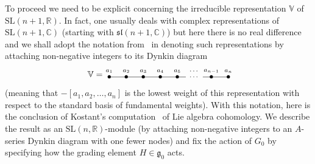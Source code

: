 \documentclass[pdftex]{sigma}
\begin{document}
To proceed we need to be explicit concerning the irreducible representation
${\mathbb{V}}$ of ${\mathrm{SL}}(n+1,{\mathbb{R}})$. In fact, one usually deals
with complex representations of ${\mathrm{SL}}(n+1,{\mathbb{C}})$ (starting
with ${\mathfrak{sl}}(n+1,{\mathbb{C}})$) but here there is no real dif\/ference
and we shall adopt the notation from~\cite{beastwood} in denoting such
representations by attaching non-negative integers to its Dynkin diagram
\[{\mathbb{V}}=\enskip\raisebox{-5pt}{\begin{picture}(140,17)
\put(0,5){\makebox(0,0){$\bullet$}}
\put(20,5){\makebox(0,0){$\bullet$}}
\put(40,5){\makebox(0,0){$\bullet$}}
\put(60,5){\makebox(0,0){$\bullet$}}
\put(80,5){\makebox(0,0){$\bullet$}}
\put(120,5){\makebox(0,0){$\bullet$}}
\put(140,5){\makebox(0,0){$\bullet$}}
\put(0,5){\line(1,0){90}}
\put(100,5){\makebox(0,0){\scriptsize$\cdots$}}
\put(110,5){\line(1,0){30}}
\put(0,12){\makebox(0,0){\scriptsize$a_1$}}
\put(20,12){\makebox(0,0){\scriptsize$a_2$}}
\put(40,12){\makebox(0,0){\scriptsize$a_3$}}
\put(60,12){\makebox(0,0){\scriptsize$a_4$}}
\put(80,12){\makebox(0,0){\scriptsize$a_5$}}
\put(100,12){\makebox(0,0){\scriptsize$\cdots$}}
\put(120,12){\makebox(0,0){\scriptsize$a_{n-1}$}}
\put(140,12){\makebox(0,0){\scriptsize$a_n$}}
\end{picture}}\]
(meaning that $-[a_1,a_2,\dots,a_n]$ is the lowest weight of this
representation with respect to the standard basis of fundamental weights).
With this notation, here is the conclusion of Kostant's computation~\cite{k}
of Lie algebra cohomology. We describe the result as an
${\mathrm{SL}}(n,{\mathbb{R}})$-module (by attaching non-negative integers to
an $A$-series Dynkin diagram with one fewer nodes) and f\/ix the action of $G_0$
by specifying how the grading element $H\in{\mathfrak{g}}_0$ acts.
\end{document}
